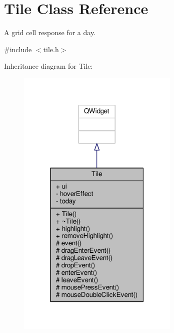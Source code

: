 \hypertarget{classTile}{}\section{Tile Class Reference}
\label{classTile}


A grid cell response for a day.  




{\ttfamily \#include $<$tile.\+h$>$}



Inheritance diagram for Tile\+:
\nopagebreak
\begin{figure}[H]
\begin{center}
\leavevmode
\includegraphics[width=219pt]{classTile__inherit__graph}
\end{center}
\end{figure}



